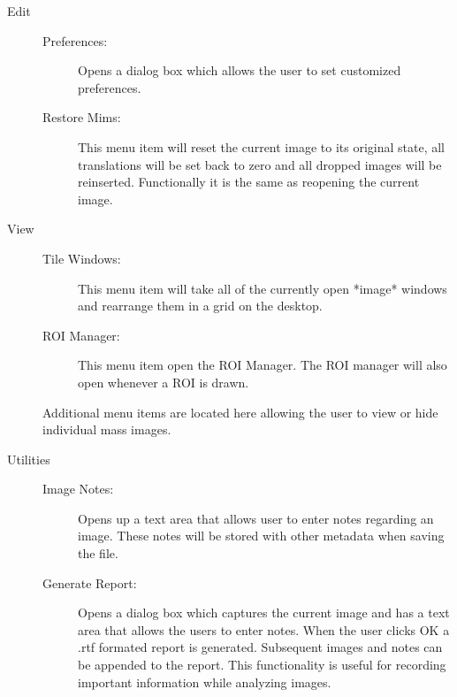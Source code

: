 \documentclass{article}
\begin{document}
\begin{description}
\begin{description}
	\end{description}
	
	\item[\large{Edit}] \indent                       
	
	\begin{description}
	
	\item[Preferences:] Opens a dialog box which allows the user to set customized preferences.
	
	\item[Restore Mims:] This menu item will reset the current image to its
	original state, all translations will be set back to zero and all dropped images will be
	reinserted. Functionally it is the same as reopening the current image. 
	
	\end{description}
	
	\item[\large{View}] \indent                       
	\begin{description}
	
	\item[Tile Windows:] This menu item will take all of the currently open *image* windows
	and rearrange them in a grid on the desktop.
	
	\item[ROI Manager:] This menu item open the ROI Manager. The ROI manager will also
	open whenever a ROI is drawn.
	
	\end{description}
	
	Additional menu items are located here allowing the user to view or hide individual mass images.
	
	\item[\large{Utilities}] \indent                       
	
	\begin{description}
	
	\item[Image Notes:] Opens up a text area that allows user to enter notes regarding an image.
	These notes will be stored with other metadata when saving the file.
	
	\item[Generate Report:] Opens a dialog box which captures the current image and has a text area that
	allows the users to enter notes. When the user clicks OK a .rtf formated report is generated. Subsequent 
	images and notes can be appended to the report. This functionality is useful for recording important
	information while analyzing images.
	

\end{description}
\end{description}
\end{document}
